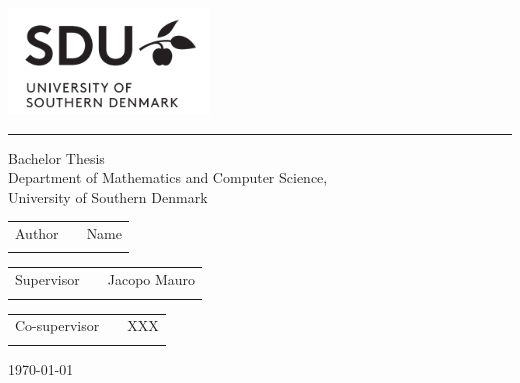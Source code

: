 \begin{titlepage}
\Large
\includegraphics[width=0.4\textwidth]{imgs/logo.png}
\renewcommand{\thepage}{Title}
\thispagestyle{empty}
       \begin{center}
       \vspace*{1cm}
\linespread{1.25}
       {\doublespacing \Huge\textbf{}}
\linespread{1}
       \rule{\linewidth}{1pt}
       {\huge Bachelor Thesis \\
       \Large Department of Mathematics and Computer Science, \\
       University of Southern Denmark}
\end{center}
\vspace{5cm}
\Large
\begin{tabularx}{\textwidth}{lXr}
Author & & Name \\ \\
\end{tabularx}
\begin{tabularx}{\textwidth}{lXr}
Supervisor & & Jacopo Mauro\\ \\
\end{tabularx}
\begin{tabularx}{\textwidth}{lXr}
Co-supervisor & & XXX \\ \\
\end{tabularx}

\vfill
\large \today
\end{titlepage}
